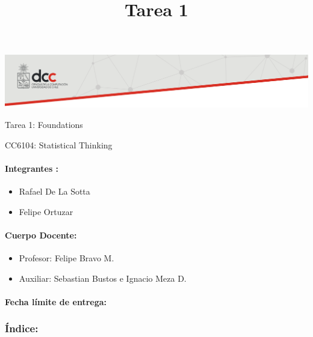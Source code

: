 \documentclass[]{article}
\title{Tarea 1}
\author{}
\date{}
\providecommand{\tightlist}{%
  \setlength{\itemsep}{0pt}\setlength{\parskip}{0pt}}
\let\oldparagraph\paragraph
\renewcommand{\paragraph}[1]{\oldparagraph{#1}\mbox{}}
\begin{document}
\maketitle

\includegraphics{banner.png}

Tarea 1: Foundations

CC6104: Statistical Thinking

\hypertarget{integrantes}{%
\paragraph{\texorpdfstring{\textbf{Integrantes
:}}{Integrantes :}}\label{integrantes}}

\begin{itemize}
\tightlist
\item
  Rafael De La Sotta
\item
  Felipe Ortuzar
\end{itemize}

\hypertarget{cuerpo-docente}{%
\paragraph{\texorpdfstring{\textbf{Cuerpo
Docente:}}{Cuerpo Docente:}}\label{cuerpo-docente}}

\begin{itemize}
\tightlist
\item
  Profesor: Felipe Bravo M.
\item
  Auxiliar: Sebastian Bustos e Ignacio Meza D.
\end{itemize}

\hypertarget{fecha-limite-de-entrega}{%
\paragraph{\texorpdfstring{\textbf{Fecha límite de
entrega:}}{Fecha límite de entrega:}}\label{fecha-limite-de-entrega}}

\hypertarget{indice}{%
\subsubsection{\texorpdfstring{\textbf{Índice:}}{Índice:}}\label{indice}}
\end{document}
